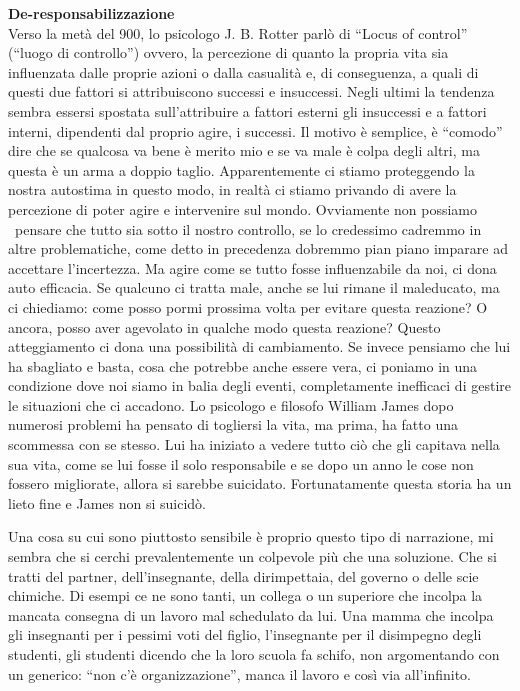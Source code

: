 \documentclass[12pt]{book} %
\begin{document}
\noindent \textbf{\large De-responsabilizzazione} \\
Verso la metà del 900, lo psicologo J. B. Rotter parlò di “Locus of control” (“luogo di controllo”) ovvero, la
percezione di quanto la propria vita sia influenzata dalle proprie azioni o dalla casualità e, di conseguenza, a quali
di questi due fattori si attribuiscono successi e insuccessi. Negli ultimi la tendenza sembra essersi spostata
sull'attribuire a fattori esterni gli insuccessi e a fattori interni, dipendenti dal proprio
agire, i successi. Il motivo è semplice, è “comodo” dire che se qualcosa va bene è merito mio e se va male è colpa
degli altri, ma questa è un arma a doppio taglio. Apparentemente ci stiamo proteggendo la nostra autostima in questo
modo, in realtà ci stiamo privando di avere la percezione di poter agire e intervenire sul mondo. Ovviamente non
possiamo \ pensare che tutto sia sotto il nostro controllo, se lo credessimo cadremmo in altre problematiche, come
detto in precedenza dobremmo pian piano imparare ad accettare l'incertezza. Ma agire come se tutto
fosse influenzabile da noi, ci dona auto efficacia. Se qualcuno ci tratta male, anche se lui rimane il maleducato, ma
ci chiediamo: come posso pormi prossima volta per evitare questa reazione? O ancora, posso aver agevolato in qualche
modo questa reazione? Questo atteggiamento ci dona una possibilità di cambiamento. Se invece pensiamo che lui ha
sbagliato e basta, cosa che potrebbe anche essere vera, ci poniamo in una condizione dove noi siamo in balia degli
eventi, completamente inefficaci di gestire le situazioni che ci accadono. Lo psicologo e filosofo William James dopo
numerosi problemi ha pensato di togliersi la vita, ma prima, ha fatto una scommessa con se stesso. Lui ha iniziato a
vedere tutto ciò che gli capitava nella sua vita, come se lui fosse il solo responsabile e se dopo un anno le cose non
fossero migliorate, allora si sarebbe suicidato. Fortunatamente questa storia ha un lieto fine e James non si suicidò.

Una cosa su cui sono piuttosto sensibile è proprio questo tipo di narrazione, mi sembra che si cerchi prevalentemente un
colpevole più che una soluzione. Che si tratti del partner, dell'insegnante, della dirimpettaia,
del governo o delle scie chimiche. Di esempi ce ne sono tanti, un collega o un superiore che incolpa la mancata
consegna di un lavoro mal schedulato da lui. Una mamma che incolpa gli insegnanti per i pessimi voti del figlio,
l'insegnante per il disimpegno degli studenti, gli studenti dicendo che la loro scuola fa schifo,
non argomentando con un generico: “non c'è organizzazione”, manca il lavoro e così via
all'infinito.
\end{document}
